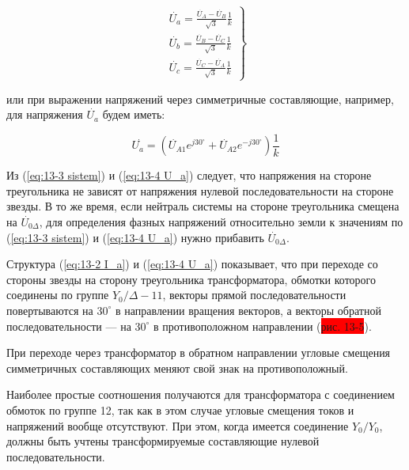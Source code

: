 \begin{equation} %
    \label{eq:13-3 sistem}
    \left.
	\begin{matrix}
        \overset{\;.}{U}_a = \frac{\overset{\;.}{U}_A - \overset{\;.}{U}_B}{\sqrt{3}} \frac{1}{k} \\ 
        \overset{\;.}{U}_b = \frac{\overset{\;.}{U}_B - \overset{\;.}{U}_C}{\sqrt{3}} \frac{1}{k} \\ 
        \overset{\;.}{U}_c = \frac{\overset{\;.}{U}_C - \overset{\;.}{U}_A}{\sqrt{3}} \frac{1}{k}
    \end{matrix}\right\}
\end{equation}

или при выражении напряжений через симметричные составляющие, например, для напряжения $ \overset{\;.}{U}_a $ будем иметь:

\begin{equation} %
    \label{eq:13-4 U_a}
    \overset{\;.}{U_a} = (\overset{\;.}{U}_{A1} e^{j30^\circ} + \overset{\;.}{U}_{A2} e^{-j30^\circ}) \frac{1}{k}
\end{equation}

Из (\ref{eq:13-3 sistem}) и (\ref{eq:13-4 U_a}) следует, что напряжения на стороне треугольника не зависят от напряжения нулевой последовательности на стороне звезды. В то же время, если нейтраль системы на стороне треугольника смещена на $ \overset{\;.}{U}_{0\Delta} $, для определения фазных напряжений относительно земли к значениям по (\ref{eq:13-3 sistem}) и (\ref{eq:13-4 U_a}) нужно прибавить $ \overset{\;.}{U}_{0\Delta} $.

Структура (\ref{eq:13-2 I_a}) и (\ref{eq:13-4 U_a}) показывает, что при переходе со стороны звезды на сторону треугольника трансформатора, обмотки которого соединены по группе $ Y_{0}/\Delta-11 $, векторы прямой последовательности повертываются на $ 30^\circ $ в направлении вращения векторов, а векторы обратной последовательности — на $ 30^\circ $ в противоположном направлении (\colorbox{red}{рис. 13-5}).

При переходе через трансформатор в обратном направлении угловые смещения симметричных составляющих меняют свой знак на противоположный.

Наиболее простые соотношения получаются для трансформатора с соединением обмоток по группе 12, так как в этом случае угловые смещения токов и напряжений вообще отсутствуют. При этом, когда имеется соединение $ Y_{0}/Y_{0} $, должны быть учтены трансформируемые составляющие нулевой последовательности.

